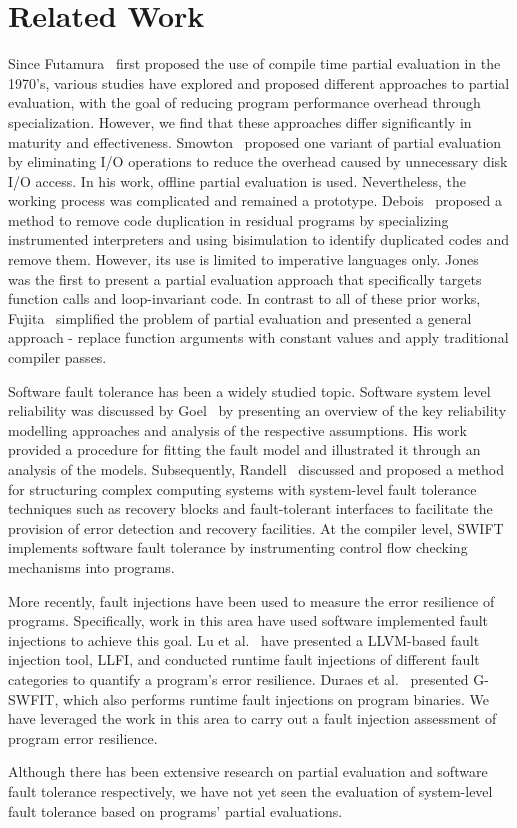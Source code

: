\section{Related Work}
\label{sec:related-work}

Since Futamura~\cite{Futamura} first proposed the use of compile time partial evaluation in the 1970’s, various studies have explored and proposed different approaches to partial evaluation, with the goal of reducing program performance overhead through specialization. 
However, we find that these approaches differ significantly in maturity and effectiveness.
Smowton~\cite{Smowton} proposed one variant of partial evaluation by eliminating I/O operations to reduce the overhead caused by unnecessary disk I/O access. In his work, offline partial evaluation is used.
Nevertheless, the working process was complicated and remained a prototype.
Debois~\cite{Debois} proposed a method to remove code duplication in residual programs by specializing instrumented interpreters and using bisimulation to identify duplicated codes and remove them.
However, its use is limited to imperative languages only.
Jones~\cite{Jones1996} was the first to present a partial evaluation approach that specifically targets function calls and loop-invariant code.
In contrast to all of these prior works, Fujita~\cite{Fujita} simplified the problem of partial evaluation and presented a general approach - replace function arguments with constant values and apply traditional compiler passes. 

Software fault tolerance has been a widely studied topic.
Software system level reliability was discussed by Goel~\cite{Softwarereliability} by presenting an overview of the key reliability modelling approaches and analysis of the respective assumptions.
His work provided a procedure for fitting the fault model and illustrated it through an analysis of the models.
Subsequently, Randell~\cite{Randell} discussed and proposed a method for structuring complex computing systems with system-level fault tolerance techniques such as recovery blocks and fault-tolerant interfaces to facilitate the provision of error detection and recovery facilities. 
At the compiler level, SWIFT~\cite{SWIFT} implements software fault tolerance by instrumenting control flow checking mechanisms into programs.

More recently, fault injections have been used to measure the error resilience of programs.
Specifically, work in this area have used software implemented fault injections to achieve this goal.
Lu et al.~\cite{LLFI} have presented a LLVM-based fault injection tool, LLFI, and conducted runtime fault injections of different fault categories to quantify a program's error resilience.
Duraes et al.~\cite{Duraes2006} presented G-SWFIT, which also performs runtime fault injections on program binaries.
We have leveraged the work in this area to carry out a fault injection assessment of program error resilience. 

Although there has been extensive research on partial evaluation and software fault tolerance respectively, we have not yet seen the evaluation of system-level fault tolerance based on programs' partial evaluations.
